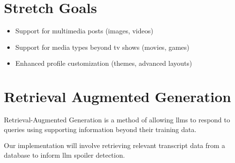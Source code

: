 \documentclass{homework}
\begin{document}
\section{Stretch Goals}
\begin{itemize}
  \item Support for multimedia posts (images, videos)
  \item Support for media types beyond tv shows (movies, games)
  \item Enhanced profile customization (themes, advanced layouts)
\end{itemize}

\bigskip

\section{Retrieval Augmented Generation}\label{rag:exp}

Retrieval-Augmented Generation is a method of allowing llms to respond to queries using supporting information beyond their training data. 

Our implementation will involve retrieving relevant transcript data from a database to inform llm spoiler detection.

% 
% 
\end{document}
